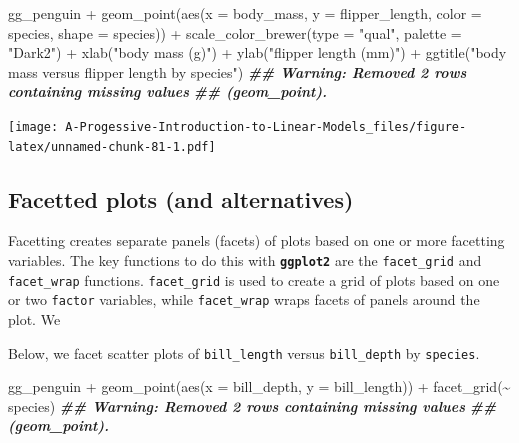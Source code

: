 \documentclass[
]{book}
\newenvironment{Shaded}{\begin{snugshade}}{\end{snugshade}}
\newcommand{\AttributeTok}[1]{\textcolor[rgb]{0.77,0.63,0.00}{#1}}
\newcommand{\DocumentationTok}[1]{\textcolor[rgb]{0.56,0.35,0.01}{\textbf{\textit{#1}}}}
\newcommand{\FunctionTok}[1]{\textcolor[rgb]{0.00,0.00,0.00}{#1}}
\newcommand{\NormalTok}[1]{#1}
\newcommand{\SpecialCharTok}[1]{\textcolor[rgb]{0.00,0.00,0.00}{#1}}
\newcommand{\StringTok}[1]{\textcolor[rgb]{0.31,0.60,0.02}{#1}}
\theoremstyle{definition}
\theoremstyle{definition}
\theoremstyle{definition}
\theoremstyle{definition}
\theoremstyle{remark}
\begin{document}
\begin{Shaded}
\begin{Highlighting}[]
\NormalTok{gg\_penguin }\SpecialCharTok{+}
  \FunctionTok{geom\_point}\NormalTok{(}\FunctionTok{aes}\NormalTok{(}\AttributeTok{x =}\NormalTok{ body\_mass, }\AttributeTok{y =}\NormalTok{ flipper\_length,}
                 \AttributeTok{color =}\NormalTok{ species, }\AttributeTok{shape =}\NormalTok{ species)) }\SpecialCharTok{+}
  \FunctionTok{scale\_color\_brewer}\NormalTok{(}\AttributeTok{type =} \StringTok{"qual"}\NormalTok{, }\AttributeTok{palette =} \StringTok{"Dark2"}\NormalTok{) }\SpecialCharTok{+}
  \FunctionTok{xlab}\NormalTok{(}\StringTok{"body mass (g)"}\NormalTok{) }\SpecialCharTok{+} \FunctionTok{ylab}\NormalTok{(}\StringTok{"flipper length (mm)"}\NormalTok{) }\SpecialCharTok{+}
  \FunctionTok{ggtitle}\NormalTok{(}\StringTok{"body mass versus flipper length by species"}\NormalTok{)}
\DocumentationTok{\#\# Warning: Removed 2 rows containing missing values}
\DocumentationTok{\#\# (geom\_point).}
\end{Highlighting}
\end{Shaded}

\texttt{[image: A-Progessive-Introduction-to-Linear-Models\_files/figure-latex/unnamed-chunk-81-1.pdf]}

\hypertarget{facetted-plots-and-alternatives}{%
\subsection{Facetted plots (and alternatives)}\label{facetted-plots-and-alternatives}}

Facetting creates separate panels (facets) of plots based on one or more facetting variables. The key functions to do this with \textbf{\texttt{ggplot2}} are the \texttt{facet\_grid} and \texttt{facet\_wrap} functions. \texttt{facet\_grid} is used to create a grid of plots based on one or two \texttt{factor} variables, while \texttt{facet\_wrap} wraps facets of panels around the plot. We

Below, we facet scatter plots of \texttt{bill\_length} versus \texttt{bill\_depth} by \texttt{species}.

\begin{Shaded}
\begin{Highlighting}[]
\NormalTok{gg\_penguin }\SpecialCharTok{+}
  \FunctionTok{geom\_point}\NormalTok{(}\FunctionTok{aes}\NormalTok{(}\AttributeTok{x =}\NormalTok{ bill\_depth, }\AttributeTok{y =}\NormalTok{ bill\_length)) }\SpecialCharTok{+}
  \FunctionTok{facet\_grid}\NormalTok{(}\SpecialCharTok{\textasciitilde{}}\NormalTok{ species)}
\DocumentationTok{\#\# Warning: Removed 2 rows containing missing values}
\DocumentationTok{\#\# (geom\_point).}
\end{Highlighting}
\end{Shaded}
\end{document}
